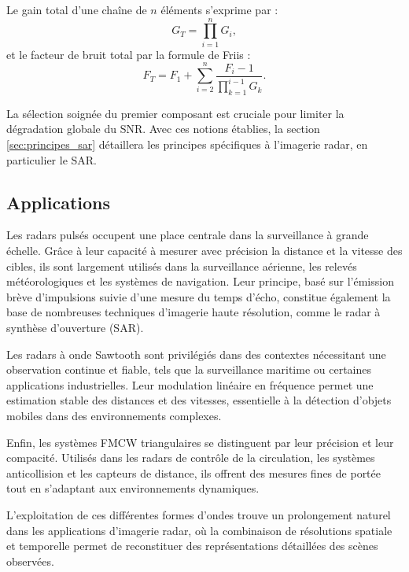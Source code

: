 \noindent Le gain total d’une chaîne de $n$ éléments s’exprime par \cite{Friis1944Noise} :
\begin{equation}
    G_T = \prod_{i=1}^n G_i,
    \label{eq:gain_total}
\end{equation}
et le facteur de bruit total par la formule de Friis :
\begin{equation}
    F_T = F_1 + \sum_{i=2}^n \frac{F_i - 1}{\prod_{k=1}^{i-1} G_k}.
    \label{eq:formule_friis_bruit}
\end{equation}

La sélection soignée du premier composant est cruciale pour limiter la dégradation globale du SNR. Avec ces notions établies, la section \ref{sec:principes_sar} détaillera les principes spécifiques à l’imagerie radar, en particulier le SAR.


\subsection{Applications}

Les radars pulsés occupent une place centrale dans la surveillance à grande échelle. Grâce à leur capacité à mesurer avec précision la distance et la vitesse des cibles, ils sont largement utilisés dans la surveillance aérienne, les relevés météorologiques et les systèmes de navigation. Leur principe, basé sur l’émission brève d’impulsions suivie d’une mesure du temps d’écho, constitue également la base de nombreuses techniques d’imagerie haute résolution, comme le radar à synthèse d’ouverture (SAR). 

Les radars à onde Sawtooth sont privilégiés dans des contextes nécessitant une observation continue et fiable, tels que la surveillance maritime ou certaines applications industrielles. Leur modulation linéaire en fréquence permet une estimation stable des distances et des vitesses, essentielle à la détection d’objets mobiles dans des environnements complexes.

Enfin, les systèmes FMCW triangulaires se distinguent par leur précision et leur compacité. Utilisés dans les radars de contrôle de la circulation, les systèmes anticollision et les capteurs de distance, ils offrent des mesures fines de portée tout en s’adaptant aux environnements dynamiques. 

L’exploitation de ces différentes formes d’ondes trouve un prolongement naturel dans les applications d’imagerie radar, où la combinaison de résolutions spatiale et temporelle permet de reconstituer des représentations détaillées des scènes observées.

